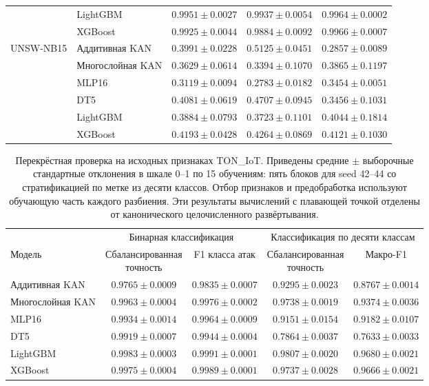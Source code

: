 \begin{table}[t]
\begin{tabular}{llccc}
 & LightGBM & $0.9951 \pm 0.0027$ & $0.9937 \pm 0.0054$ & $0.9964 \pm 0.0002$ \\
 & XGBoost & $0.9925 \pm 0.0044$ & $0.9884 \pm 0.0092$ & $0.9966 \pm 0.0007$ \\
\midrule
UNSW-NB15 & Аддитивная KAN & $0.3991 \pm 0.0228$ & $0.5125 \pm 0.0451$ & $0.2857 \pm 0.0089$ \\
 & Многослойная KAN & $0.3629 \pm 0.0614$ & $0.3394 \pm 0.1070$ & $0.3865 \pm 0.1197$ \\
 & MLP16 & $0.3119 \pm 0.0094$ & $0.2783 \pm 0.0182$ & $0.3454 \pm 0.0051$ \\
 & DT5 & $0.4081 \pm 0.0619$ & $0.4707 \pm 0.0945$ & $0.3456 \pm 0.1031$ \\
 & LightGBM & $0.3884 \pm 0.0793$ & $0.3723 \pm 0.1101$ & $0.4044 \pm 0.1814$ \\
 & XGBoost & $0.4193 \pm 0.0428$ & $0.4264 \pm 0.0869$ & $0.4121 \pm 0.1030$ \\
\bottomrule
\end{tabular}
\end{table}

\begin{table}[t]
\centering
\caption{Перекрёстная проверка на исходных признаках TON\_IoT. Приведены средние $\pm$ выборочные стандартные отклонения в шкале 0--1 по 15 обучениям: пять блоков для seed 42--44 со стратификацией по метке из десяти классов. Отбор признаков и предобработка используют обучающую часть каждого разбиения. Эти результаты вычислений с плавающей точкой отделены от канонического целочисленного развёртывания.}
\label{tab:supp-native-cv}
\footnotesize
\setlength{\tabcolsep}{4pt}
\begin{tabular}{lcccc}
\toprule
& \multicolumn{2}{c}{Бинарная классификация} & \multicolumn{2}{c}{Классификация по десяти классам} \\
\cmidrule(lr){2-3}\cmidrule(lr){4-5}
Модель & \shortstack{Сбалансированная\\точность} & F1 класса атак & \shortstack{Сбалансированная\\точность} & Макро-F1 \\
\midrule
Аддитивная KAN & $0.9765 \pm 0.0009$ & $0.9835 \pm 0.0007$ & $0.9295 \pm 0.0023$ & $0.8767 \pm 0.0014$ \\
Многослойная KAN & $0.9963 \pm 0.0004$ & $0.9976 \pm 0.0002$ & $0.9738 \pm 0.0019$ & $0.9374 \pm 0.0036$ \\
MLP16 & $0.9934 \pm 0.0014$ & $0.9964 \pm 0.0009$ & $0.9151 \pm 0.0154$ & $0.9182 \pm 0.0107$ \\
DT5 & $0.9919 \pm 0.0007$ & $0.9944 \pm 0.0004$ & $0.7864 \pm 0.0037$ & $0.7633 \pm 0.0033$ \\
LightGBM & $0.9983 \pm 0.0003$ & $0.9991 \pm 0.0001$ & $0.9807 \pm 0.0020$ & $0.9680 \pm 0.0021$ \\
XGBoost & $0.9975 \pm 0.0004$ & $0.9989 \pm 0.0001$ & $0.9737 \pm 0.0028$ & $0.9666 \pm 0.0021$ \\
\bottomrule
\end{tabular}
\end{table}

